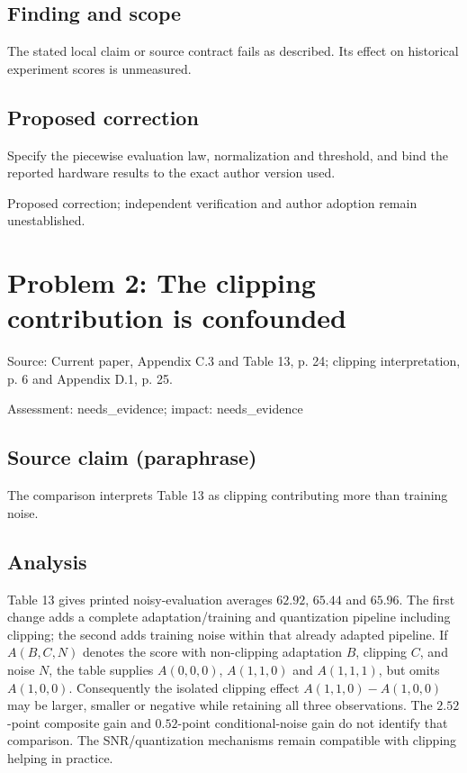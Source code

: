 \documentclass[11pt]{article}
\begin{document}
\subsection*{Finding and scope}

The stated local claim or source contract fails as described. Its effect on historical experiment scores is unmeasured.

\subsection*{Proposed correction}

Specify the piecewise evaluation law, normalization and threshold, and bind the reported hardware results to the exact author version used.

Proposed correction; independent verification and author adoption remain unestablished.

\section*{Problem 2: The clipping contribution is confounded}

Source: Current paper, Appendix C.3 and Table 13, p. 24; clipping interpretation, p. 6 and Appendix D.1, p. 25.

Assessment: needs\_evidence; impact: needs\_evidence

\subsection*{Source claim (paraphrase)}

The comparison interprets Table 13 as clipping contributing more than training noise.

\subsection*{Analysis}

Table 13 gives printed noisy-evaluation averages \(62.92\), \(65.44\) and \(65.96\). The first change adds a complete adaptation/training and quantization pipeline including clipping; the second adds training noise within that already adapted pipeline. If \(A(B,C,N)\) denotes the score with non-clipping adaptation \(B\), clipping \(C\), and noise \(N\), the table supplies \(A(0,0,0)\), \(A(1,1,0)\) and \(A(1,1,1)\), but omits \(A(1,0,0)\). Consequently the isolated clipping effect \(A(1,1,0)-A(1,0,0)\) may be larger, smaller or negative while retaining all three observations. The \(2.52\)-point composite gain and \(0.52\)-point conditional-noise gain do not identify that comparison. The SNR/quantization mechanisms remain compatible with clipping helping in practice.
\end{document}
